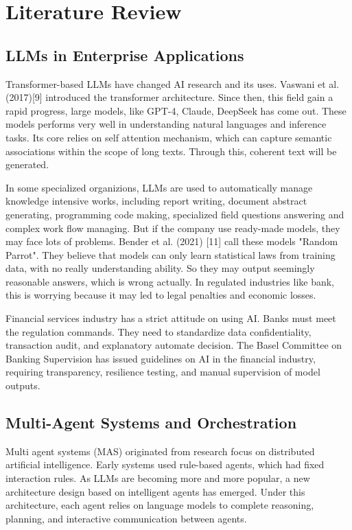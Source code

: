 \section{Literature Review}

\subsection{LLMs in Enterprise Applications}

Transformer-based LLMs have changed AI research and its uses. Vaswani et al. (2017)[9] introduced the transformer architecture. Since then, this field gain a rapid progress, large models, like GPT-4, Claude, DeepSeek has come out. These models performs very well in understanding natural languages and inference tasks. Its core relies on self attention mechanism, which can capture semantic associations within the scope of long texts. Through this, coherent text will be generated.

In some specialized organizions, LLMs are used to automatically manage knowledge intensive works, including report writing, document abstract generating, programming code making, specialized field questions answering and complex work flow managing. But if the company use ready-made models, they may face lots of problems. Bender et al. (2021) [11] call these models "Random Parrot". They believe that models can only learn statistical laws from training data, with no really understanding ability. So they may output seemingly reasonable answers, which is wrong actually. In regulated industries like bank, this is worrying because it may led to legal penalties and economic losses.

Financial services industry has a strict attitude on using AI. Banks must meet the regulation commands. They need to standardize data confidentiality, transaction audit, and explanatory automate decision. The Basel Committee on Banking Supervision has issued guidelines on AI in the financial industry, requiring transparency, resilience testing, and manual supervision of model outputs.

\subsection{Multi-Agent Systems and Orchestration}

Multi agent systems (MAS) originated from research focus on distributed artificial intelligence. Early systems used rule-based agents, which had fixed interaction rules. As LLMs are becoming more and more popular, a new architecture design based on intelligent agents has emerged. Under this architecture, each agent relies on language models to complete reasoning, planning, and interactive communication between agents.


